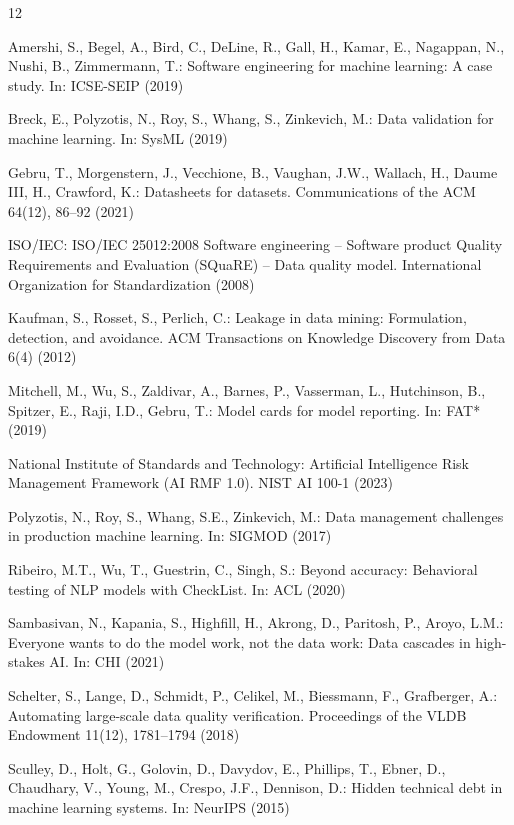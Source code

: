 \documentclass[runningheads]{llncs}
\begin{document}
\begin{thebibliography}{12}

Amershi, S., Begel, A., Bird, C., DeLine, R., Gall, H., Kamar, E., Nagappan, N.,
Nushi, B., Zimmermann, T.: Software engineering for machine learning: A case
study. In: ICSE-SEIP (2019)

Breck, E., Polyzotis, N., Roy, S., Whang, S., Zinkevich, M.: Data validation for
machine learning. In: SysML (2019)

Gebru, T., Morgenstern, J., Vecchione, B., Vaughan, J.W., Wallach, H., Daume III,
H., Crawford, K.: Datasheets for datasets. Communications of the ACM 64(12),
86--92 (2021)

ISO/IEC: ISO/IEC 25012:2008 Software engineering -- Software product Quality
Requirements and Evaluation (SQuaRE) -- Data quality model. International
Organization for Standardization (2008)

Kaufman, S., Rosset, S., Perlich, C.: Leakage in data mining: Formulation,
detection, and avoidance. ACM Transactions on Knowledge Discovery from Data 6(4)
(2012)

Mitchell, M., Wu, S., Zaldivar, A., Barnes, P., Vasserman, L., Hutchinson, B.,
Spitzer, E., Raji, I.D., Gebru, T.: Model cards for model reporting. In: FAT*
(2019)

National Institute of Standards and Technology: Artificial Intelligence Risk
Management Framework (AI RMF 1.0). NIST AI 100-1 (2023)

Polyzotis, N., Roy, S., Whang, S.E., Zinkevich, M.: Data management challenges
in production machine learning. In: SIGMOD (2017)

Ribeiro, M.T., Wu, T., Guestrin, C., Singh, S.: Beyond accuracy: Behavioral
testing of NLP models with CheckList. In: ACL (2020)

Sambasivan, N., Kapania, S., Highfill, H., Akrong, D., Paritosh, P., Aroyo, L.M.:
Everyone wants to do the model work, not the data work: Data cascades in high-
stakes AI. In: CHI (2021)

Schelter, S., Lange, D., Schmidt, P., Celikel, M., Biessmann, F., Grafberger, A.:
Automating large-scale data quality verification. Proceedings of the VLDB
Endowment 11(12), 1781--1794 (2018)

Sculley, D., Holt, G., Golovin, D., Davydov, E., Phillips, T., Ebner, D.,
Chaudhary, V., Young, M., Crespo, J.F., Dennison, D.: Hidden technical debt in
machine learning systems. In: NeurIPS (2015)

\end{thebibliography}
\end{document}
